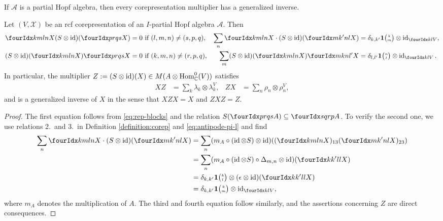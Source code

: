 If $\mathscr{A}$ is a partial Hopf algebra,  then every
corepresentation multiplier has a generalized inverse.
\begin{Lem} \label{lemma:rep-invertible}
  Let $(V,\mathscr{X})$ be an rcf corepresentation of an $I$-partial Hopf
  algebra $\mathscr{A}$. Then
  \begin{align*}
    \Gr{X}{k}{l}{m}{n}  (S \otimes
      \id)(\Gr{X}{p}{q}{r}{s}) &=0 \text{ if } (l,m,n)\neq(s,p,q), &
      \sum_{n} \Gr{X}{k}{l}{m}{n} \cdot (S \otimes
      \id)(\Gr{X}{m}{n}{k'}{l}) &= \delta_{k,k'}\UnitC{k}{m} \otimes
      \id_{\Gru{V}{k}{l}}, \\
      (S \otimes \id)(\Gr{X}{k}{l}{m}{n}) \Gr{X}{p}{q}{r}{s} &= 0
      \text{ if } (k,m,n)\neq (r,p,q), & \sum_{m}
      (S \otimes \id)(\Gr{X}{k}{l}{m}{n}) \Gr{X}{m}{n}{k}{l'} &=
      \delta_{l,l'} \UnitC{n}{l} \otimes \id_{\Gru{V}{k}{l}}.
  \end{align*}
  In particular, the multiplier $Z:=     (S \otimes
  \operatorname{id})(X) \in M(A \otimes \operatorname{Hom}_{\mathbb{C}}^{0}(V))$
  satisfies
  \begin{align} \label{eq:rep-generalized-inverse}
    XZ &= \sum_{k} \lambda_{k} \otimes \lambda^{V}_{k}, &
    ZX &= \sum_{n} \rho_{n} \otimes \rho^{V}_{n},
  \end{align}
  and is a generalized inverse of $X$ in the sense that $XZX=X$ and $ZXZ=Z$.
\end{Lem}
\begin{proof}
  The first equation follows from \eqref{eq:rep-blocks} and the
  relation  $S(\Gr{A}{p}{q}{r}{s})\subseteq \Gr{A}{s}{r}{q}{p}$. To
  verify the second one, we use relations 2.\ and 3.\ in Definition
  \ref{definition:corep} and \eqref{eq:antipode-pi-l} and find
  \begin{align*}
      \sum_{n} \Gr{X}{k}{l}{m}{n} \cdot (S \otimes
      \id)(\Gr{X}{m}{n}{k'}{l}) &= \sum_{n} (m_{A} \circ (\id \otimes S)
      \otimes \id)((\Gr{X}{k}{l}{m}{n})_{13}(\Gr{X}{m}{n}{k'}{l})_{23})
 \\ &= \sum_{n} (m_{A} \circ (\id \otimes S) \circ \Delta_{m,n} \otimes
      \id)(\Gr{X}{k}{l}{k'}{l}) \\
      &= \delta_{k,k'} \UnitC{k}{l} \otimes (\epsilon \otimes
      \id)(\Gr{X}{k}{l}{k'}{l})
      \\ &=
\delta_{k,k'}\UnitC{k}{m} \otimes
      \id_{\Gru{V}{k}{l}},  \end{align*}
where $m_{A}$ denotes the multiplication of $A$. The third and fourth
equation follow similarly, and the assertions concerning $Z$ are
direct consequences.
\end{proof}
